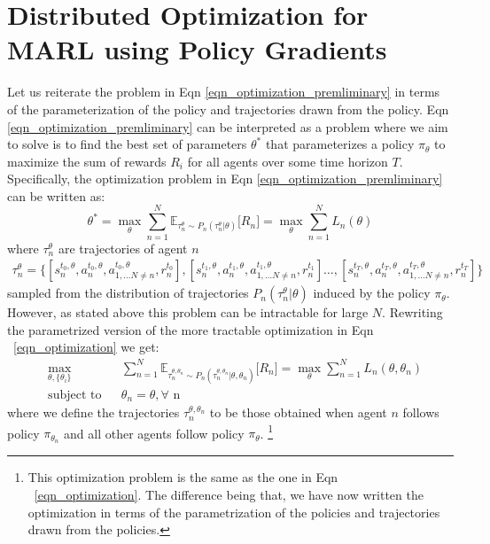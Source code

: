 \documentclass{article}
\begin{document}
\section{Distributed Optimization for MARL using Policy Gradients}
Let us reiterate the problem in Eqn \ref{eqn_optimization_premliminary} in terms of the parameterization of the policy and trajectories drawn from the policy. Eqn \ref{eqn_optimization_premliminary} can be interpreted as a problem where we aim to solve is to find the best set of parameters $\theta^*$ that parameterizes a policy $\pi_\theta$ to maximize the sum of rewards $R_i$ for all agents over some time horizon $T$. Specifically, the optimization problem in Eqn \ref{eqn_optimization_premliminary} can be written as:
\begin{equation}\label{opt1}
\theta^* = \max_{\theta} \sum_{n=1}^{N} \mathbb{E}_{\tau_n^{\theta} \sim P_n(\tau_n^{\theta} | \theta)} \Big[ R_n \Big] = \max_{\theta} \sum_{n=1}^{N} L_n(\theta)
\end{equation}
where $\tau_n^{\theta}$ are trajectories of agent $n$
\begin{equation} \label{traj1}
\begin{split}
\tau_{n}^\theta=\Big\{ [s_{n}^{t_0,\theta},a_{n}^{t_0,\theta}, a_{1,\ldots N \neq n}^{t_0,\theta}, r_{n}^{t_0}], [s_{n}^{t_1,\theta},a_{n}^{t_1,\theta}, a_{1,\ldots N \neq n}^{t_1,\theta}, r_{n}^{t_1}]
\ldots,  [s_{n}^{t_T,\theta},a_{n}^{t_T,\theta}, a_{1,\ldots N \neq n}^{t_T,\theta}, r_{n}^{t_T} ] \Big\} 
\end{split}
\end{equation}
sampled from the distribution of trajectories $P_n(\tau_n^{\theta} | \theta)$ induced by the policy $\pi_\theta$. However, as stated above this problem can be intractable for large $N$. Rewriting the parametrized version of the more tractable optimization in Eqn ~\ref{eqn_optimization} we get:
\begin{equation}\label{opt2}
\begin{aligned}
& \underset{\theta, \{\theta_i\}}{\text{max}}
& & \sum_{n=1}^{N} \mathbb{E}_{\tau_n^{\theta,\theta_n} \sim P_n(\tau_n^{\theta,\theta_n} | \theta, \theta_n)} \Big[ R_n \Big] = \max_{\theta} \sum_{n=1}^{N} L_n(\theta, \theta_n)\\
& \text{subject to}
& & \theta_n = \theta, \forall \text{ n}
\end{aligned}
\end{equation}
where we define the trajectories $\tau_n^{\theta,\theta_n}$ to be those obtained when agent $n$ follows policy $\pi_{\theta_n}$ and all other agents follow policy $\pi_\theta$. \footnote{This optimization problem is the same as the one in Eqn ~\ref{eqn_optimization}. The difference being that, we have now written the optimization in terms of the parametrization of the policies and trajectories drawn from the policies.} 
\end{document}
